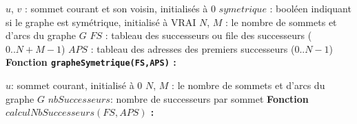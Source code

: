 \documentclass[a4paper,12pt]{article}
\begin{document}
\begin{algorithm}[H]
  \DontPrintSemicolon
  $u$, $v$ : sommet courant et son voisin, initialisés à 0\;
  $symetrique$ : booléen indiquant si le graphe est symétrique,
  initialisé à VRAI \;
  $N$, $M$ : le nombre de sommets et d'arcs du graphe $G$ \;
  $FS$ : tableau des successeurs ou file des successeurs
  ($0..N+M-1$) \;
  $APS$ : tableau des adresses des premiers successeurs
  ($0..N-1$)\; %
  \BlankLine
  \textbf{Fonction \texttt{grapheSymetrique(FS,APS)} : } \;
  \caption{Algorithme de vérification de la symétrie du graphe $G$
    codé avec FS/APS}
  \label{algo:symetrique}
\end{algorithm}


\begin{algorithm}[H]
  \DontPrintSemicolon
  $u$: sommet courant, initialisé à 0\;
  $N$, $M$ : le nombre de sommets et d'arcs du graphe $G$ \;
  $nbSuccesseurs$: nombre de successeurs par sommet \;
  \BlankLine
  \textbf{Fonction $calculNbSuccesseurs(FS,APS)$ : } \;
  \caption{Fonction de calcul du nombre de successeurs par sommets}
  \label{algo:nbsuccesseurs}
\end{algorithm}
\end{document}
